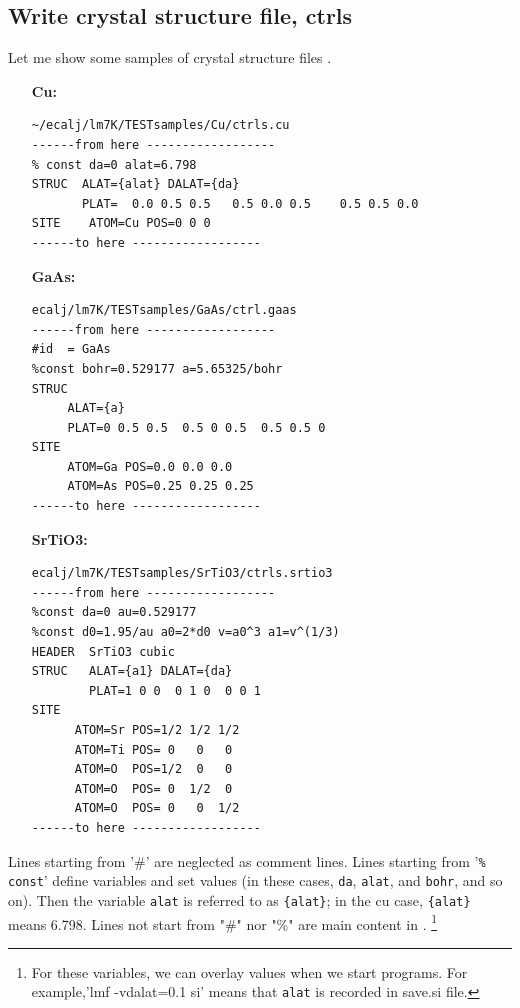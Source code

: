 \subsection{Write crystal structure file, ctrls}
\label{ctrls}
Let me show some samples of crystal structure files \ctrls. 
\begin{itemize}
\item[\bf Cu:]
\begin{verbatim}
~/ecalj/lm7K/TESTsamples/Cu/ctrls.cu
------from here ------------------
% const da=0 alat=6.798
STRUC  ALAT={alat} DALAT={da}
       PLAT=  0.0 0.5 0.5   0.5 0.0 0.5    0.5 0.5 0.0
SITE    ATOM=Cu POS=0 0 0
------to here ------------------
\end{verbatim}

\item[\bf GaAs:]
\begin{verbatim}
ecalj/lm7K/TESTsamples/GaAs/ctrl.gaas
------from here ------------------
#id  = GaAs
%const bohr=0.529177 a=5.65325/bohr 
STRUC
     ALAT={a} 
     PLAT=0 0.5 0.5  0.5 0 0.5  0.5 0.5 0 
SITE
     ATOM=Ga POS=0.0 0.0 0.0
     ATOM=As POS=0.25 0.25 0.25
------to here ------------------
\end{verbatim}
\item[\bf SrTiO3:]
\begin{verbatim}
ecalj/lm7K/TESTsamples/SrTiO3/ctrls.srtio3 
------from here ------------------
%const da=0 au=0.529177
%const d0=1.95/au a0=2*d0 v=a0^3 a1=v^(1/3)
HEADER  SrTiO3 cubic 
STRUC   ALAT={a1} DALAT={da} 
        PLAT=1 0 0  0 1 0  0 0 1
SITE
      ATOM=Sr POS=1/2 1/2 1/2
      ATOM=Ti POS= 0   0   0
      ATOM=O  POS=1/2  0   0
      ATOM=O  POS= 0  1/2  0
      ATOM=O  POS= 0   0  1/2
------to here ------------------
\end{verbatim}
\end{itemize}

Lines starting from '\#' are neglected as comment lines.
Lines starting from '\verb+% const+' define variables and set values
(in these cases, \verb+da+, \verb+alat+, and \verb+bohr+, and so on). 
Then the variable \verb+alat+ is referred to as \verb+{alat}+; in the cu case,
\verb+{alat}+ means 6.798.
Lines not start from "\#" nor "\%" are main content in \ctrls.
\footnote{For these variables, we can overlay values when we start
programs. For example,'lmf -vdalat=0.1 si' means that \texttt{alat} is recorded in save.si file.}

